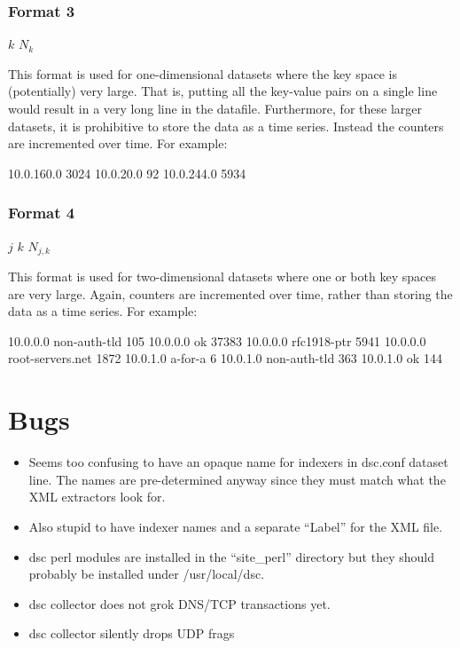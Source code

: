 \documentclass{report}
\def\dsc{{\sc dsc}}
\begin{document}
\subsection{Format 3}

\noindent
\begin{tt}$k$ $N_{k}$
\end{tt}

\vspace{1ex}\noindent
This format is used for one-dimensional datasets where the key space
is (potentially) very large.  That is, putting all the key-value pairs
on a single line would result in a very long line in the datafile.
Furthermore, for these larger datasets, it is prohibitive to
store the data as a time series.  Instead the counters are incremented
over time.  For example:

\begin{MyVerbatim}
10.0.160.0 3024
10.0.20.0 92
10.0.244.0 5934
\end{MyVerbatim}

\subsection{Format 4}

\noindent
\begin{tt}$j$ $k$ $N_{j,k}$
\end{tt}

\vspace{1ex}\noindent
This format is used for two-dimensional datasets where one or both
key spaces are very large.  Again, counters are incremented over
time, rather than storing the data as a time series.
For example:

\begin{MyVerbatim}
10.0.0.0 non-auth-tld 105
10.0.0.0 ok 37383
10.0.0.0 rfc1918-ptr 5941
10.0.0.0 root-servers.net 1872
10.0.1.0 a-for-a 6
10.0.1.0 non-auth-tld 363
10.0.1.0 ok 144
\end{MyVerbatim}

\chapter{Bugs}

\begin{itemize}

\item
	Seems too confusing to have an opaque name for indexers in
	dsc.conf dataset line.  The names are pre-determined anyway
	since they must match what the XML extractors look for.
\item
	Also stupid to have indexer names and a separate ``Label'' for
	the XML file.

\item
	{\dsc} perl modules are installed in the ``site\_perl'' directory
	but they should probably be installed under /usr/local/dsc.

\item
	{\dsc} collector does not grok DNS/TCP transactions yet.

\item
	{\dsc} collector silently drops UDP frags

\end{itemize}
\end{document}
